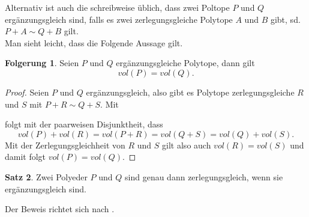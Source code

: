 \documentclass[11pt,titlepage]{article}
\theoremstyle{definition}
\newtheorem{theorem}{Satz}[section]
\newtheorem{corollary}[theorem]{Folgerung}
\theoremstyle{remark}
\begin{document}
	Alternativ ist auch die schreibweise üblich, dass zwei Poltope $P$ und $Q$
	ergänzungsgleich sind, falls es zwei zerlegungsgleiche Polytope 
	$A$ und $B$ gibt, sd. $P+A\sim Q+B$ gilt. \\
	Man sieht leicht, dass die Folgende Aussage gilt.
	
	\begin{corollary}\label{coroll:ergvol}
		Seien $P$ und $Q$ ergänzungsgleiche Polytope, dann gilt
		\[vol(P)=vol(Q).\]
	\end{corollary}
	
	\begin{proof}
		Seien $P$ und $Q$ ergänzungsgleich, also gibt es Polytope 
		zerlegungsgleiche $R$ und $S$ mit $P+R\sim Q+S$. Mit
		
		
		folgt mit der paarweisen Disjunktheit, dass 
		\[vol(P)+vol(R)=vol(P+R)=vol(Q+S)=vol(Q)+vol(S).\]
		Mit der Zerlegungsgleichheit von $R$ und $S$ gilt also auch $vol(R)=vol(S)$ 
		und damit folgt $vol(P)=vol(Q)$.
	\end{proof}
	
	\begin{theorem} \label{thm:zerlerg}
		Zwei Polyeder $P$ und $Q$ sind genau dann zerlegungsgleich, wenn sie 
		ergänzungsgleich sind.
	\end{theorem}
	
	Der Beweis richtet sich nach \cite[Satz III]{Hadwiger}.
	
\end{document}
